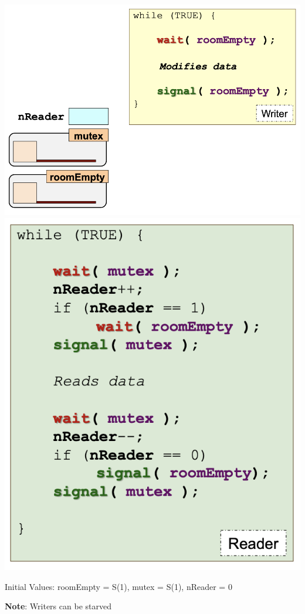 \documentclass[10pt, a4paper]{article}
\newcommand{\highlight}[1]{{\color{red}\textbf{#1}}}
\newcommand{\red}[1]{{\color{red}#1}}
\begin{document}
\begin{multicols*}{3}
		\includegraphics[scale=0.32]{./assets/Writer.png}
		\includegraphics[scale=0.35]{./assets/Reader.png}

		Initial Values: roomEmpty = S(1), mutex = S(1), nReader = 0

		\highlight{Note}: Writers can be \red{starved}


\end{multicols*}
\end{document}
